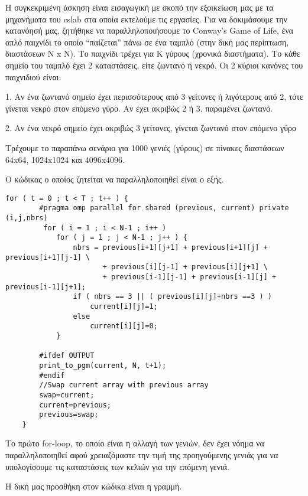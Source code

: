 \documentclass[../final_report.tex]{subfiles}
\begin{document}
Η συγκεκριμένη άσκηση είναι εισαγωγική με σκοπό την εξοικείωση μας με τα μηχανήματα του cslab στα οποία εκτελούμε τις εργασίες. Για να δοκιμάσουμε την κατανόησή μας, ζητήθηκε να παραλληλοποιήσουμε το Conway’s Game of Life, ένα απλό παιχνίδι το οποίο “παίζεται” πάνω σε ένα ταμπλό (στην δική μας περίπτωση, διαστάσεων N x N). Το παιχνίδι τρέχει για Κ γύρους (χρονικά διαστήματα). Το κάθε σημείο του ταμπλό έχει 2 καταστάσεις, είτε ζωντανό ή νεκρό. Οι 2 κύριοι κανόνες του παιχνιδιού είναι: \newline

1.	Αν ένα ζωντανό σημείο έχει περισσότερους από 3 γείτονες ή λιγότερους από 2, τότε γίνεται νεκρό στον επόμενο γύρο. Αν έχει ακριβώς 2 ή 3, παραμένει ζωντανό. 

2.	Αν ένα νεκρό σημείο έχει ακριβώς 3 γείτονες, γίνεται ζωντανό στον επόμενο γύρο \newline

Τρέχουμε το παραπάνω σενάριο για 1000 γενιές (γύρους) σε πίνακες διαστάσεων 64x64, 1024x1024 και 4096x4096. \newline

Ο κώδικας ο οποίος ζητείται να παραλληλοποιηθεί είναι ο εξής.


\begin{lstlisting}
for ( t = 0 ; t < T ; t++ ) {
        #pragma omp parallel for shared (previous, current) private (i,j,nbrs)
         for ( i = 1 ; i < N-1 ; i++ )
            for ( j = 1 ; j < N-1 ; j++ ) {
                nbrs = previous[i+1][j+1] + previous[i+1][j] + previous[i+1][j-1] \
                       + previous[i][j-1] + previous[i][j+1] \
                       + previous[i-1][j-1] + previous[i-1][j] + previous[i-1][j+1];
                if ( nbrs == 3 || ( previous[i][j]+nbrs ==3 ) )
                    current[i][j]=1;
                else
                    current[i][j]=0;
            }

        #ifdef OUTPUT
        print_to_pgm(current, N, t+1);
        #endif
        //Swap current array with previous array
        swap=current;
        current=previous;
        previous=swap;
    }
\end{lstlisting}



Το πρώτο for-loop, το οποίο είναι η αλλαγή των γενιών, δεν έχει νόημα να παραλληλοποιηθεί αφού χρειαζόμαστε την τιμή της προηγούμενης γενιάς για να υπολογίσουμε τις καταστάσεις των κελιών για την επόμενη γενιά.


Η δική μας προσθήκη στον κώδικα είναι η γραμμή.
\end{document}
